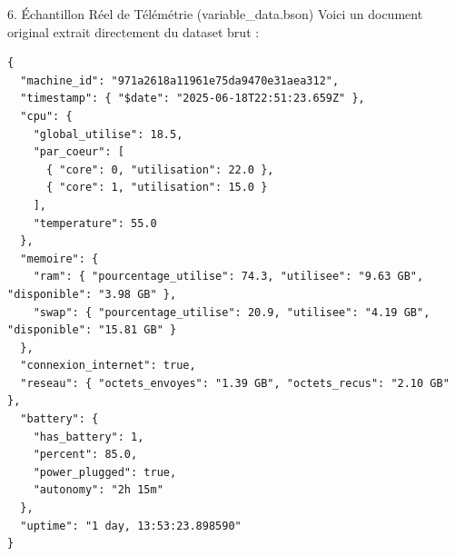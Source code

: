 \documentclass[10pt,aspectratio=169]{beamer}
\begin{document}
\begin{frame}[fragile]{6. Échantillon Réel de Télémétrie (variable\_data.bson)}
  Voici un document original extrait directement du dataset brut :
  
  \begin{lstlisting}
{
  "machine_id": "971a2618a11961e75da9470e31aea312",
  "timestamp": { "$date": "2025-06-18T22:51:23.659Z" },
  "cpu": {
    "global_utilise": 18.5,
    "par_coeur": [
      { "core": 0, "utilisation": 22.0 },
      { "core": 1, "utilisation": 15.0 }
    ],
    "temperature": 55.0
  },
  "memoire": {
    "ram": { "pourcentage_utilise": 74.3, "utilisee": "9.63 GB", "disponible": "3.98 GB" },
    "swap": { "pourcentage_utilise": 20.9, "utilisee": "4.19 GB", "disponible": "15.81 GB" }
  },
  "connexion_internet": true,
  "reseau": { "octets_envoyes": "1.39 GB", "octets_recus": "2.10 GB" },
  "battery": {
    "has_battery": 1,
    "percent": 85.0,
    "power_plugged": true,
    "autonomy": "2h 15m"
  },
  "uptime": "1 day, 13:53:23.898590"
}
  \end{lstlisting}
\end{frame}
\end{document}
